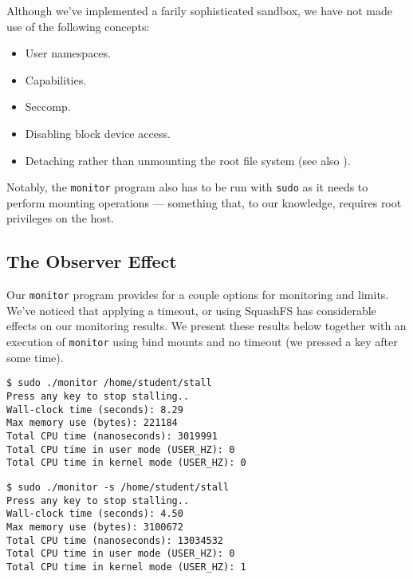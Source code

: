 Although we've implemented a farily sophisticated sandbox, we have not made use
of the following concepts:

\begin{itemize}

\item User namespaces.

\item Capabilities.

\item Seccomp.

\item Disabling block device access.

\item Detaching rather than unmounting the root file system (see also
).

\end{itemize}

Notably, the \texttt{monitor} program also has to be run with \texttt{sudo} as
it needs to perform mounting operations --- something that, to our knowledge,
requires root privileges on the host.

\subsection{The Observer Effect}

Our \texttt{monitor} program provides for a couple options for monitoring and
limits. We've noticed that applying a timeout, or using SquashFS has
considerable effects on our monitoring results. We present these results below
together with an execution of \texttt{monitor} using bind mounts and no timeout
(we pressed a key after some time).

\begin{lstlisting}
$ sudo ./monitor /home/student/stall
Press any key to stop stalling..
Wall-clock time (seconds): 8.29
Max memory use (bytes): 221184
Total CPU time (nanoseconds): 3019991
Total CPU time in user mode (USER_HZ): 0
Total CPU time in kernel mode (USER_HZ): 0
\end{lstlisting}

\begin{lstlisting}
$ sudo ./monitor -s /home/student/stall
Press any key to stop stalling..
Wall-clock time (seconds): 4.50
Max memory use (bytes): 3100672
Total CPU time (nanoseconds): 13034532
Total CPU time in user mode (USER_HZ): 0
Total CPU time in kernel mode (USER_HZ): 1
\end{lstlisting}

